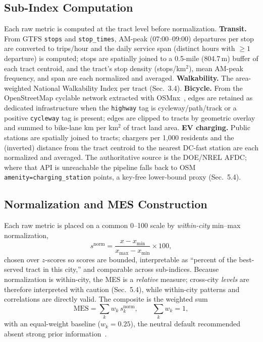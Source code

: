 \documentclass[11pt]{article}
\begin{document}
\subsection{Sub-Index Computation}
Each raw metric is computed at the tract level before normalization.
\textbf{Transit.} From GTFS \texttt{stops} and \texttt{stop\_times}, AM-peak
(07:00--09:00) departures per stop are converted to trips/hour and the daily
service span (distinct hours with $\geq 1$ departure) is computed; stops are
spatially joined to a 0.5-mile (804.7\,m) buffer of each tract centroid, and the
tract's stop density (stops/km$^2$), mean AM-peak frequency, and span are each
normalized and averaged. \textbf{Walkability.} The area-weighted National
Walkability Index per tract (Sec.~3.4). \textbf{Bicycle.} From the OpenStreetMap
cyclable network extracted with OSMnx~\cite{boeing2017}, edges are retained as
dedicated infrastructure when the \texttt{highway} tag is cycleway/path/track or a
positive \texttt{cycleway} tag is present; edges are clipped to tracts by
geometric overlay and summed to bike-lane km per km$^2$ of tract land area.
\textbf{EV charging.} Public stations are spatially joined to tracts; chargers per
1{,}000 residents and the (inverted) distance from the tract centroid to the
nearest DC-fast station are each normalized and averaged. The authoritative
source is the DOE/NREL AFDC; where that API is unreachable the pipeline falls back
to OSM \texttt{amenity=charging\_station} points, a key-free lower-bound proxy
(Sec.~5.4).

\subsection{Normalization and MES Construction}
Each raw metric is placed on a common 0--100 scale by \emph{within-city}
min--max normalization,
\[
s^{\text{norm}} = \frac{x - x_{\min}}{x_{\max}-x_{\min}}\times 100,
\]
chosen over $z$-scores so scores are bounded, interpretable as ``percent of the
best-served tract in this city,'' and comparable across sub-indices. Because
normalization is within-city, the MES is a \emph{relative} measure; cross-city
\emph{levels} are therefore interpreted with caution (Sec.~5.4), while within-city
patterns and correlations are directly valid. The composite is the weighted sum
\[
\mathrm{MES} = \sum_{k} w_k\, s_k^{\text{norm}}, \qquad \sum_k w_k = 1,
\]
with an equal-weight baseline ($w_k = 0.25$), the neutral default recommended
absent strong prior information~\cite{nardo2008}.
\end{document}
